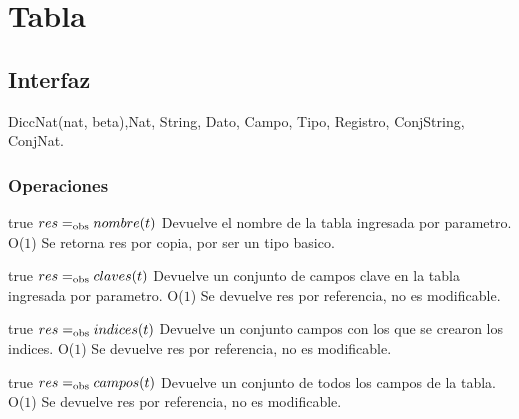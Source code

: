 


\newpage
\section{Tabla}

\subsection{Interfaz}

 {DiccNat(nat, beta),}{Nat, String, Dato, Campo, Tipo, Registro, ConjString, ConjNat.}




\subsubsection*{Operaciones}



 {true}
 {$res =_{\mathrm{obs}} nombre(t)$}
 {Devuelve el nombre de la tabla ingresada por parametro.}
 {O($1$)}
 {Se retorna res por copia, por ser un tipo basico.}

 {true}
 {$res =_{\mathrm{obs}} claves(t)$}
 {Devuelve un conjunto de campos clave en la tabla ingresada por parametro.}
 {O($1$)}
 {Se devuelve res por referencia, no es modificable.}
 
 {true}
 {$res =_{\mathrm{obs}} indices(t)$}
 {Devuelve un conjunto campos con los que se crearon los indices.}
 {O($1$)}
 {Se devuelve res por referencia, no es modificable.}
 
 {true}
 {$res =_{\mathrm{obs}} campos(t)$}
 {Devuelve un conjunto de todos los campos de la tabla.}
 {O($1$)}
 {Se devuelve res por referencia, no es modificable.}

